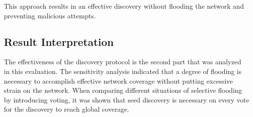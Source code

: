 This approach results in an effective discovery without flooding the network and preventing malicious attempts.

%
%

\subsection{Result Interpretation}

The effectiveness of the discovery protocol is the second part that was analyzed in this evaluation. The sensitivity analysis indicated that a degree of flooding is necessary to accomplish effective network coverage without putting excessive strain on the network. When comparing different situations of selective flooding by introducing voting, it was shown that seed discovery is necessary on every vote for the discovery to reach global coverage.

